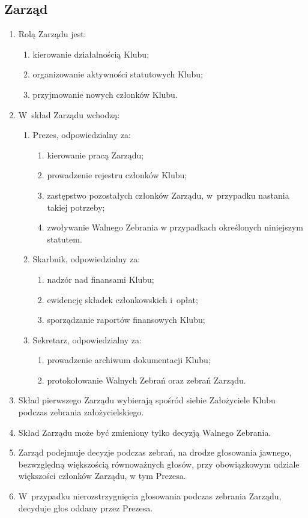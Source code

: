 \subsection{Zarząd}
\begin{enumerate}
    \item Rolą Zarządu jest:
    \begin{enumerate}
        \item kierowanie działalnością Klubu;
        \item organizowanie aktywności statutowych Klubu;
        \item przyjmowanie nowych członków Klubu.
    \end{enumerate}
    \item W~skład Zarządu wchodzą:
    \begin{enumerate}
        \item Prezes, odpowiedzialny za:
        \begin{enumerate}
            \item kierowanie pracą Zarządu;
            \item prowadzenie rejestru członków Klubu;
            \item zastępstwo pozostałych członków Zarządu, w~przypadku nastania takiej potrzeby;
            \item zwoływanie Walnego Zebrania w przypadkach określonych niniejszym statutem.
        \end{enumerate}
        \item Skarbnik, odpowiedzialny za:
        \begin{enumerate}
            \item nadzór nad finansami Klubu;
            \item ewidencję składek członkowskich i~opłat;
            \item sporządzanie raportów finansowych Klubu;
        \end{enumerate}
        \item Sekretarz, odpowiedzialny za:
        \begin{enumerate}
            \item prowadzenie archiwum dokumentacji Klubu;
            \item protokołowanie Walnych Zebrań oraz zebrań Zarządu.
        \end{enumerate}
    \end{enumerate}
    \item Skład pierwszego Zarządu wybierają spośród siebie Założyciele Klubu podczas zebrania założycielskiego.
    \item Skład Zarządu może być zmieniony tylko decyzją Walnego Zebrania.
    \item Zarząd podejmuje decyzje podczas zebrań, na drodze głosowania jawnego, bezwzględną większością równoważnych głosów, przy obowiązkowym udziale większości członków Zarządu, w tym Prezesa.
    \item W~przypadku nierozstrzygnięcia głosowania podczas zebrania Zarządu, decyduje głos oddany przez Prezesa.
\end{enumerate}
